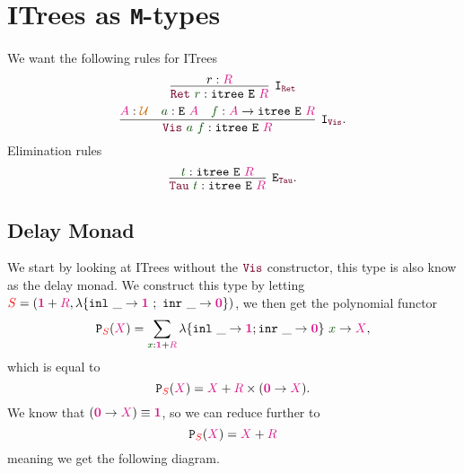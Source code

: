 \documentclass[twoside,11pt,openright]{report}
\theoremstyle{plain} %
\theoremstyle{definition}
\theoremstyle{remark}
\newcommand*{\term}[1]{\textcolor{green!30!black}{#1}} %
\newcommand*{\type}[1]{\textcolor{magenta!90!black}{#1}}
\newcommand*{\container}[1]{\textcolor{red}{#1}}
\newcommand*{\universe}[1]{\textcolor{orange!80!black}{#1}}
\newcommand*{\unit}{\type{\textbf{1}}}
\newcommand*{\empt}{\type{\textbf{0}}}
\newcommand*{\constructor}[1]{\textcolor{purple!60!black}{\ensuremath{\mathtt{#1}}}}
\newcommand*{\typeformer}[1]{\ensuremath{\mathtt{#1}}}
\newcommand*{\functor}[1]{\ensuremath{\mathbf{\mathtt{#1}}}}
\begin{document}
\section{ITrees as \texttt{M}-types}
We want the following rules for ITrees
\begin{equation}
  \vcenter{\infer[\mathtt{I}_{\constructor{Ret}}]{\constructor{Ret}~\term{r} : \typeformer{itree}~\typeformer{E}~\type{R}}{r : \type{R}}}
\end{equation}
\begin{equation}
  \vcenter{\infer[\mathtt{I}_{\constructor{Vis}}]{\constructor{Vis}~\term{a}~\term{f} : \typeformer{itree}~\typeformer{E}~\type{R}}{\type{A} : \universe{\mathcal{U}} & \term{a} : \typeformer{E}~\type{A} & \term{f} : \type{A} \rightarrow \typeformer{itree}~\typeformer{E}~\type{R}}}.
\end{equation}
Elimination rules
\begin{equation}
  \vcenter{\infer[\mathtt{E}_{\constructor{Tau}}]{\constructor{Tau}~\term{t} : \typeformer{itree}~\typeformer{E}~\type{R}}{\term{t} : \typeformer{itree}~\typeformer{E}~\type{R}}}.
\end{equation}

\subsection{Delay Monad}
We start by looking at ITrees without the \(\constructor{Vis}\) constructor, this type is also know as the delay monad. We construct this type by letting \(\container{S} = (\unit + \type{R},\lambda \{ \texttt{inl}~\_ \rightarrow \unit~;~\texttt{inr}~\_ \rightarrow \empt \})\), we then get the polynomial functor
\begin{equation}
  \functor{P}_{\container{S}}(\type{X}) = \sum_{\term{x} : \unit + \type{R}} \lambda \{ \texttt{inl}~\_ \rightarrow \unit ; \texttt{inr}~\_ \rightarrow \empt\}~\term{x} \rightarrow \type{X},
\end{equation}
which is equal to
\begin{equation}
  \functor{P}_{\container{S}}(\type{X}) = \type{X} + \type{R} \times (\empt \rightarrow \type{X}).
\end{equation}
We know that \((\empt \rightarrow \type{X}) \equiv \unit\), so we can reduce further to
\begin{equation}
  \functor{P}_{\container{S}}(\type{X}) = \type{X} + \type{R}
\end{equation}
meaning we get the following diagram.
\end{document}
